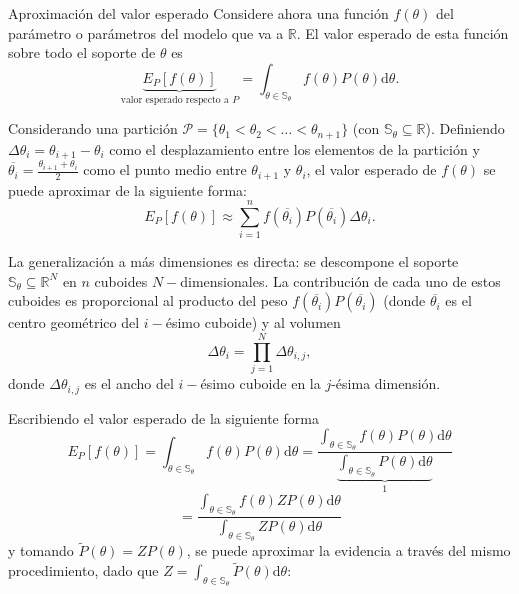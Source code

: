 \documentclass{beamer}
\begin{document}
	\begin{frame}[allowframebreaks]{Aproximación del valor esperado}
	Considere ahora una función $f(\theta)$ del parámetro o parámetros del modelo que va a $\mathbb{R}$. El valor esperado de esta función sobre todo el soporte de $\theta$ es
		\begin{equation}
			\underbrace{E_P[f(\theta)]}_{\text{valor esperado respecto a }P}=\int_{\theta\in\mathbb{S}_\theta} f(\theta)P(\theta)\mathrm{d}\theta.
		\end{equation}
		
		Considerando una partición $\mathcal{P}=\{\theta_1<\theta_2<\dots<\theta_{n+1}\}$ (con $\mathbb{S}_\theta\subseteq\mathbb{R}$). Definiendo $\Delta\theta_i=\theta_{i+1}-\theta_i$ como el desplazamiento entre los elementos de la partición y $\overline{\theta_i}=\frac{\theta_{i+1}+\theta_i}{2}$ como el punto medio entre $\theta_{i+1}$ y $\theta_i$, el valor esperado de $f(\theta)$ se puede aproximar de la siguiente forma:
		\begin{equation}\label{firstAproximation}
			E_P[f(\theta)]\approx \sum_{i=1}^n f(\overline{\theta_i})P(\overline{\theta_i})\Delta \theta_i.
		\end{equation}
		
		La generalización a más dimensiones es directa: se descompone el soporte $\mathbb{S}_\theta\subseteq\mathbb{R}^N$ en $n$ cuboides $N-$dimensionales. La contribución de cada uno de estos cuboides es proporcional al producto del peso $f(\overline{\theta_i})P(\overline{\theta_i})$ (donde $\overline{\theta_i}$ es el centro geométrico del $i-$ésimo cuboide) y al volumen
		$$\Delta \theta_i=\prod_{j=1}^N \Delta \theta_{i,j},$$
		donde $\Delta\theta_{i,j}$ es el ancho del $i-$ésimo cuboide en la $j$-ésima dimensión.
		
		Escribiendo el valor esperado de la siguiente forma
		$$E_P[f(\theta)]=\int_{\theta\in\mathbb{S}_\theta} f(\theta)P(\theta)\mathrm{d}\theta=\frac{\int_{\theta\in\mathbb{S}_\theta} f(\theta)P(\theta)\mathrm{d}\theta}{\underbrace{\int_{\theta\in\mathbb{S}_\theta} P(\theta)\mathrm{d}\theta}_{1}}$$ $$=\frac{\int_{\theta\in\mathbb{S}_\theta} f(\theta)ZP(\theta)\mathrm{d}\theta}{\int_{\theta\in\mathbb{S}_\theta} ZP(\theta)\mathrm{d}\theta}$$
		y tomando $\tilde{P}(\theta)=ZP(\theta)$, se puede aproximar la evidencia a través del mismo procedimiento, dado que $Z=\int_{\theta\in\mathbb{S}_\theta}\tilde{P}(\theta)\mathrm{d}\theta$:
		

\end{frame}
\end{document}
